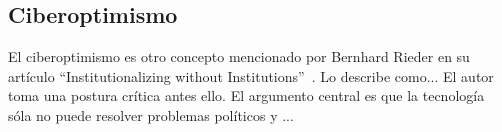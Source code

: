 \subsection{Ciberoptimismo}

El ciberoptimismo es otro concepto mencionado por Bernhard Rieder en su artículo ``Institutionalizing without Institutions''~\autocite{Rieder2012}.
Lo describe como...
El autor toma una postura crítica antes ello.
El argumento central es que la tecnología sóla no puede resolver problemas políticos y ...


\begin{comment}
[Rieder2012]

"The central point that I have tried to make over these pages is that the major fault of contempo-
rary cyber-optimism is perhaps not simply its technological determinism, but a tendency towards
an essentialist view of both technology and democracy that eschews the complexities and deep
contradictions that characterize both." (Schlussfolgerung)

"One of the most common claims frames the Internet as a force of democratization. Appearing
recently in conjunction with the “Web 2.0” phenomenon, it portrays network technology as an
agent of decentralization that will bring an end to cultural hierarchies"
Idealerweise: Bildungsauftrag, Empowerment, aber in der Realitaet wenige verstehen wirklich was da so geht und deshalb bleibt die Arbeit auch an einigen wenigen Menschen haengen.

"In this “cyber-optimistic” viewpoint, the Internet is the agent of a
“capillary revolution” that is set to bring decentralization, equality, and democracy."

"the Internet allows capillary configurations
of power – local initiatives, ad-hoc pressure groups, fan cultures, “issue publics” – to challenge
the statutory powers that be. "
Allerdings:
Wird argumentiert, dass alle mitmachen koennen, das stimmt aber nicth so direkt.
Koloniale Zusammenhaenge bestehen;
Geographische Schwierigkeiten;
Oekonom. Probleme (oft in Kombi mit schwierigem Terrain); --> Kommerzielle Provider haben kein Interesse
Staatliche Repression --> dem Staat passt nicht dass X oder Y kommunizieren kann und eine oeffentliche Plattform hat

"while for communitarians the digital world mir-
rors the values of egalitarian forms of direct democracy and grassroots networking.” (Norris
2001, p. 232)"


\end{comment}
